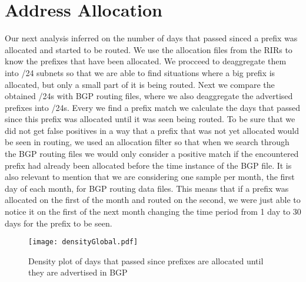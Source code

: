 \documentclass[11pt,a4paper]{scrreprt}
\begin{document}
\section{Address Allocation}

Our next analysis inferred on the number of days that passed sinced a prefix was allocated and started to be routed. We use the allocation files from the RIRs to know the prefixes that have been allocated. We procceed to deaggregate them into /24 subnets so that we are able to find situations where a big prefix is allocated, but only a small part of it is being routed. Next we compare the obtained /24s with BGP routing files, where we also deaggregate the advertised prefixes into /24s. Every we find a prefix match we calculate the days that passed since this prefix was allocated until it was seen being routed. To be sure that we did not get false positives in a way that a prefix that was not yet allocated would be seen in routing, we used an allocation filter so that when we search through the BGP routing files we would only consider a positive match if the encountered prefix had already been allocated before the time instance of the BGP file. It is also relevant to mention that we are considering one sample per month, the first day of each month, for BGP routing data files. This means that if a prefix was allocated on the first of the month and routed on the second, we were just able to notice it on the first of the next month changing the time period from 1 day to 30 days for the prefix to be seen.  

\begin{figure}[!h]
\centering
\texttt{[image: densityGlobal.pdf]}
\caption{Density plot of days that passed since prefixes are allocated until they are advertised in BGP}
\label{fig:densityGlobal}
\end{figure}
\end{document}
